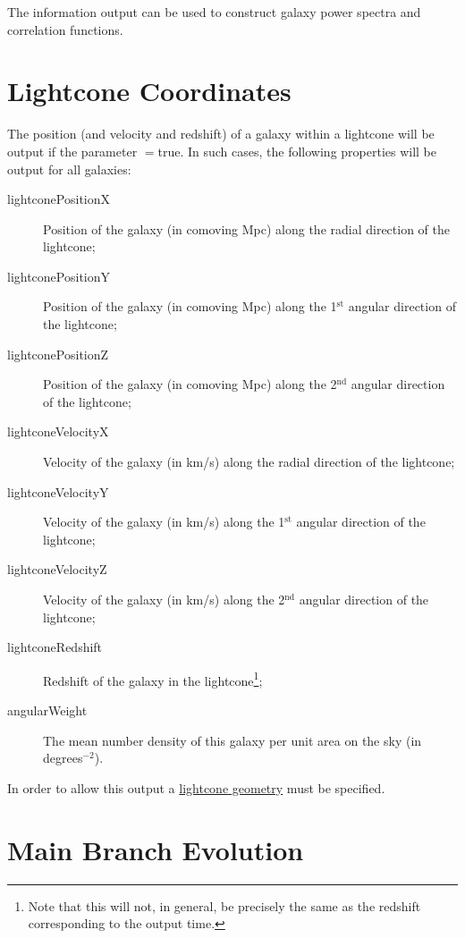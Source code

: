 The information output can be used to construct galaxy power spectra and correlation functions.

\section{Lightcone Coordinates}\label{sec:OutputLightcone}

The position (and velocity and redshift) of a galaxy within a lightcone will be output if the parameter {\normalfont \ttfamily [outputLightconeData]}$=${\normalfont \ttfamily true}. In such cases, the following properties will be output for all galaxies:
\begin{description}
 \item [{\normalfont \ttfamily lightconePositionX}] Position of the galaxy (in comoving Mpc) along the radial direction of the lightcone;
 \item [{\normalfont \ttfamily lightconePositionY}] Position of the galaxy (in comoving Mpc) along the 1$^\mathrm{st}$ angular direction of the lightcone;
 \item [{\normalfont \ttfamily lightconePositionZ}] Position of the galaxy (in comoving Mpc) along the 2$^\mathrm{nd}$ angular direction of the lightcone;
 \item [{\normalfont \ttfamily lightconeVelocityX}] Velocity of the galaxy (in km/s) along the radial direction of the lightcone;
 \item [{\normalfont \ttfamily lightconeVelocityY}] Velocity of the galaxy (in km/s) along the 1$^\mathrm{st}$ angular direction of the lightcone;
 \item [{\normalfont \ttfamily lightconeVelocityZ}] Velocity of the galaxy (in km/s) along the 2$^\mathrm{nd}$ angular direction of the lightcone;
 \item [{\normalfont \ttfamily lightconeRedshift}] Redshift of the galaxy in the lightcone\footnote{Note that this will not, in general, be precisely the same as the redshift corresponding to the output time.};
 \item [{\normalfont \ttfamily angularWeight}] The mean number density of this galaxy per unit area on the sky (in degrees$^{-2}$). 
\end{description}
In order to allow this output a \href{https://github.com/galacticusorg/galacticus/releases/download/masterRelease/Galacticus_Development.pdf\#methods.geometryLightcone}{lightcone geometry} must be specified.

\section{Main Branch Evolution}

